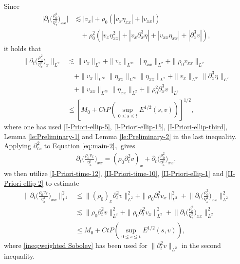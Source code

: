 \documentclass[11pt, reqno]{amsart}
\numberwithin{equation}{section}
\begin{document}
\bigskip
{}
Since
\begin{equation*}
\begin{aligned}
\bigg|\partial_t\bigg({\frac{\rho_0^2}{\eta_x^2}}\bigg)_{xx}\bigg|
&\lesssim |v_x|+\rho_0(|v_x\eta_{xx}|+|v_{xx}|)\\
&\quad+\rho_0^2(|v_x\eta_{xx}^2|+|v_x\partial_x^3\eta|+|v_{xx}\eta_{xx}|+|\partial_x^3v|),
\end{aligned}
\end{equation*}
it holds that
\begin{equation}\label{II-Priori-ellip-1}
\begin{aligned}
\bigg\|\partial_t\bigg({\frac{\rho_0^2}{\eta_x^2}}\bigg)_x\bigg\|_{L^2}
&\lesssim \|v_x\|_{L^2}+\|v_x\|_{L^\infty}\|\eta_{xx}\|_{L^2}+\|\rho_0v_{xx}\|_{L^2}\\
&\quad+\|v_x\|_{L^\infty}\|\eta_{xx}\|_{L^\infty}\|\eta_{xx}\|_{L^2}+\|v_x\|_{L^\infty}\|\partial_x^3\eta\|_{L^2}\\
&\quad+\|v_{xx}\|_{L^\infty}\|\eta_{xx}\|_{L^2}+\|\rho_0^2\partial_x^3v\|_{L^2}\\
&\leq [M_0+Ct P(\sup_{0\leq s\leq t}E^{1/2}(s,v))]^{1/2},
\end{aligned}
\end{equation}
where one has used \eqref{I-Priori-ellip-5}, \eqref{I-Priori-ellip-15}, \eqref{I-Priori-ellip-third}, Lemma \ref{le:Preliminary-1} and Lemma \ref{le:Preliminary-2} in the last inequality.
Applying \(\partial_{tx}^2\) to Equation \(\eqref{eq:main-2}_1\) gives
\begin{equation}\label{II-Priori-ellip-2}
\begin{aligned}
\partial_t\bigg(\frac{\rho_0v_x}{\eta_x^2}\bigg)_{xx}=(\rho_0\partial_t^2v)_x
+\partial_t\bigg(\frac{\rho_0^2}{\eta_x^2}\bigg)_{xx},
\end{aligned}
\end{equation}
we then utilize \eqref{I-Priori-time-12}, \eqref{II-Priori-time-10}, \eqref{II-Priori-ellip-1} and \eqref{II-Priori-ellip-2} to estimate
\begin{equation}\label{II-Priori-ellip-3}
\begin{aligned}
\bigg\|\partial_t\bigg(\frac{\rho_0v_x}{\eta_x^2}\bigg)_{xx}\bigg\|_{L^2}^2
&\leq \|(\rho_0)_x\partial_t^2v\|_{L^2}^2+\|\rho_0\partial_t^2v_x\|_{L^2}^2
+\bigg\|\partial_t\bigg(\frac{\rho_0^2}{\eta_x^2}\bigg)_{xx}\bigg\|_{L^2}^2\\
&\lesssim \|\rho_0\partial_t^2v\|_{L^2}^2+\|\rho_0\partial_t^2v_x\|_{L^2}^2
+\bigg\|\partial_t\bigg(\frac{\rho_0^2}{\eta_x^2}\bigg)_{xx}\bigg\|_{L^2}^2\\
&\leq M_0+Ct P(\sup_{0\leq s\leq t}E^{1/2}(s,v)),
\end{aligned}
\end{equation}
where  \eqref{ineq:weighted Sobolev} has been used for \(\|\partial_t^2v\|_{L^2}\) in the second inequality.
\end{document}

